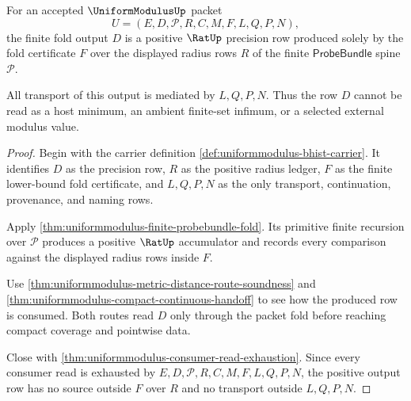 \begin{theorem}
\label{thm:uniformmodulus-finite-fold-positive-output}
For an accepted $\UniformModulusUp$ packet
$$
U=(E,D,\mathcal{P},R,C,M,F,L,Q,P,N),
$$
the finite fold output $D$ is a positive $\RatUp$ precision row produced solely by the fold certificate $F$ over the displayed radius rows $R$ of the finite $\mathsf{ProbeBundle}$ spine $\mathcal{P}$.

All transport of this output is mediated by $L,Q,P,N$. Thus the row $D$ cannot be read as a host minimum, an ambient finite-set infimum, or a selected external modulus value.
\end{theorem}
\begin{proof}
Begin with the carrier definition \autoref{def:uniformmodulus-bhist-carrier}. It identifies $D$ as the precision row, $R$ as the positive radius ledger, $F$ as the finite lower-bound fold certificate, and $L,Q,P,N$ as the only transport, continuation, provenance, and naming rows.

Apply \autoref{thm:uniformmodulus-finite-probebundle-fold}. Its primitive finite recursion over $\mathcal{P}$ produces a positive $\RatUp$ accumulator and records every comparison against the displayed radius rows inside $F$.

Use \autoref{thm:uniformmodulus-metric-distance-route-soundness} and \autoref{thm:uniformmodulus-compact-continuous-handoff} to see how the produced row is consumed. Both routes read $D$ only through the packet fold before reaching compact coverage and pointwise data.

Close with \autoref{thm:uniformmodulus-consumer-read-exhaustion}. Since every consumer read is exhausted by $E,D,\mathcal{P},R,C,M,F,L,Q,P,N$, the positive output row has no source outside $F$ over $R$ and no transport outside $L,Q,P,N$.
\end{proof}

